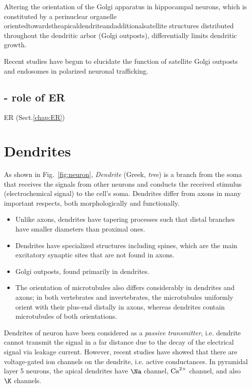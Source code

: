 Altering the orientation of the Golgi apparatus in hippocampal neurons, which is
constituted by a perinuclear organelle
orientedtowardstheapicaldendriteandadditionalsatellite structures distributed
throughout the dendritic arbor (Golgi outposts), differentially limits dendritic
growth.

Recent studies have begun to elucidate the function of satellite Golgi outposts
and endosomes in polarized neuronal trafficking.

\subsection{- role of ER}

ER (Sect.\ref{chap:ER})

\section{Dendrites}
\label{sec:dendrites}

As shown in Fig.~\ref{fig:neuron}, {\it Dendrite} (Greek, {\it tree}) is a
branch from the soma that receives the signals from other neurons and conducts the
received stimulus (electrochemical signal) to the cell's soma. 
Dendrites differ from axons in many important respects, both morphologically and
functionally. 
\begin{itemize}
  \item Unlike axons, dendrites have tapering processes such that distal
  branches have smaller diameters than proximal ones.
  
  \item Dendrites have specialized structures including spines, which are the
  main excitatory synaptic sites that are not found in axons.
  
  \item  Golgi outposts, found primarily in dendrites.
  
  \item The orientation of microtubules also differs considerably in dendrites
  and axons; in both vertebrates and invertebrates, the microtubules uniformly
  orient with their plus-end distally in axons, whereas dendrites contain
  microtubules of both orientations.
  
\end{itemize}

Dendrites of neuron have been considered as a {\it passive transmitter}, i.e. 
dendrite cannot transmit the signal in a far distance due to the decay of the
electrical signal via leakage current.
However, recent studies have showed that there are voltage-gated ion channels on
the dendrite, i.e. active conductances. In pyramidal layer 5 neurons, the
apical dendrites have $\Na$ channel, ${\text{Ca}^{2+}}$ channel, and also $\K$ channels.

